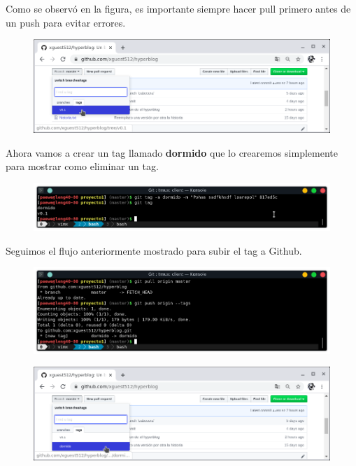\documentclass{article}
\begin{document}
Como se observó en la figura, es importante siempre hacer pull primero antes de
un push para evitar errores.

\begin{figure}[h!]
  \centering
  \includegraphics[scale=0.75]{./Pictures/239_tags_github.png}
\end{figure}

Ahora vamos a crear un tag llamado \textbf{dormido} que lo crearemos
simplemente para mostrar como eliminar un tag.

\begin{figure}[h!]
  \centering
  \includegraphics[scale=0.75]{./Pictures/240_tag_dormido.png}
\end{figure}

\newpage

Seguimos el flujo anteriormente mostrado para subir el tag a Github.

\begin{figure}[h!]
  \centering
  \includegraphics[scale=0.75]{./Pictures/241_push_tag_dormido.png}
\end{figure}

\begin{figure}[h!]
  \centering
  \includegraphics[scale=0.75]{./Pictures/241_tag_dormido_github.png}
\end{figure}
\end{document}
